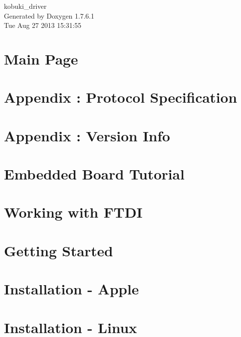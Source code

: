 \documentclass[a4paper]{book}
\begin{document}
\begin{titlepage}
\vspace*{7cm}
\begin{center}
{\Large kobuki\-\_\-driver }\\
\vspace*{1cm}
{\large \-Generated by Doxygen 1.7.6.1}\\
\vspace*{0.5cm}
{\small Tue Aug 27 2013 15:31:55}\\
\end{center}
\end{titlepage}
\clearemptydoublepage
{}
\tableofcontents
\clearemptydoublepage
{}
\chapter{\-Main \-Page}
\label{index}
\chapter{\-Appendix \-: \-Protocol \-Specification}
\label{enAppendixProtocolSpecification}

\chapter{\-Appendix \-: \-Version \-Info}
\label{enAppendixVersionInfo}

\chapter{\-Embedded \-Board \-Tutorial}
\label{enEmbeddedBoardTutorial}

\chapter{\-Working with \-F\-T\-D\-I}
\label{enFtdiGuide}

\chapter{\-Getting \-Started}
\label{enGettingStartedGuide}

\chapter{\-Installation -\/ \-Apple}
\label{koInstallationAppleGuide}

\chapter{\-Installation -\/ \-Linux}
\label{enInstallationLinuxGuide}

\end{document}
